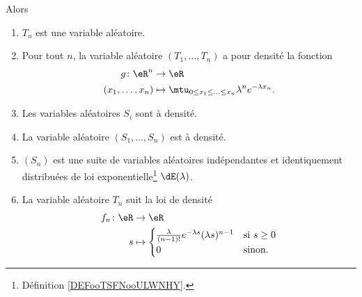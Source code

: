 \begin{theorem}
	Alors
	\begin{enumerate}
		\item       \label{ITEMooSLWOooRjYhBA}
		      \( T_n\) est une variable aléatoire.
		\item   \label{ITEMooHGXTooOdonXa}
		      Pour tout \( n\), la variable aléatoire \( (T_1,\ldots, T_n)\) a pour densité la fonction
		      \begin{equation}
			      \begin{aligned}
				      g\colon \eR^n     & \to \eR                                                                \\
				      (x_1,\ldots, x_n) & \mapsto \mtu_{0\leq x_1\leq \ldots\leq x_n}\lambda^n e^{-\lambda x_n}.
			      \end{aligned}
		      \end{equation}
		\item       \label{ITEMooGBIXooSjXpsx}
		      Les variables aléatoires \( S_i\) sont à densité.
		\item       \label{ITEMooUTTWooOUhkZh}
		      La variable aléatoire \( (S_1,\ldots, S_n)\) est à densité.
		\item       \label{ITEMooUZGFooAbCvvG}
		      \( (S_n)\) est une suite de variables aléatoires indépendantes et identiquement distribuées de loi exponentielle\footnote{Définition \ref{DEFooTSFNooULWNHY}.} \( \dE(\lambda)\).
		\item   \label{ITEMooDXZFooXkklhG}
		      La variable aléatoire \( T_n\) suit la loi de densité
		      \begin{equation}
			      \begin{aligned}
				      f_n\colon \eR & \to \eR                                                                                 \\
				      s             & \mapsto \begin{cases}
					                              \frac{ \lambda }{ (n-1)! } e^{-\lambda s}(\lambda s)^{n-1} & \text{si } s\geq 0 \\
					                              0                                                          & \text{sinon. }
				                              \end{cases} \\
			      \end{aligned}
		      \end{equation}
	\end{enumerate}
\end{theorem}

